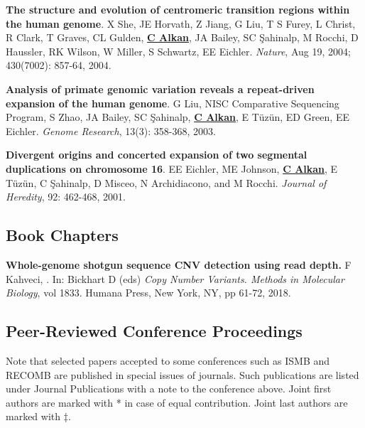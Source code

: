 \vspace{-.2cm}
  {\bf The structure and evolution of centromeric transition regions within
    the human genome}.
  X She, JE Horvath, Z Jiang, G Liu, T S Furey,
  L Christ, R Clark, T Graves, CL Gulden, {\bf \underline{C Alkan}}, JA Bailey, SC \c{S}ahinalp, 
  M Rocchi, D Haussler, RK Wilson, W Miller, S Schwartz, EE Eichler.
  {\em Nature}, Aug 19, 2004; 430(7002): 857-64, 2004.


\vspace{-.2cm}
  {\bf Analysis of primate genomic variation reveals a repeat-driven 
    expansion of the human genome}.
  G Liu, NISC Comparative Sequencing Program, S Zhao, JA Bailey, 
  SC \c{S}ahinalp, {\bf \underline{C Alkan}}, E T\"{u}z\"{u}n, ED Green, EE Eichler.
  {\em Genome Research}, 13(3): 358-368, 2003.

\vspace{-.2cm}
  {\bf Divergent origins and concerted expansion of two segmental
    duplications on 
    chromosome 16}.
  EE Eichler, ME Johnson, {\bf \underline{C Alkan}}, E T\"{u}z\"{u}n, C \c{S}ahinalp,
    D Misceo, 
    N Archidiacono, and M Rocchi.
    {\em Journal of Heredity}, 92: 462-468, 2001.


\clearpage
\vspace{-.4cm}
\subsection{\small \sc  Book Chapters}
\vspace{-.4cm}


       {\bf Whole-genome shotgun sequence CNV detection using read depth.}
       F Kahveci, \calkan{}.
       In: Bickhart D (eds) {\em Copy Number Variants. Methods in Molecular Biology}, vol 1833. Humana Press, New York, NY, pp 61-72, 2018.



\vspace{-.4cm}
\subsection{\small \sc  Peer-Reviewed Conference Proceedings}
\vspace{-.4cm}
       {\small
Note that selected papers accepted to some conferences such as ISMB and RECOMB are published
in special issues of journals. Such publications are listed under Journal Publications with a note to the conference above.
Joint first authors are marked with * in case of equal contribution.
Joint last authors are marked with $\ddag$.
}


